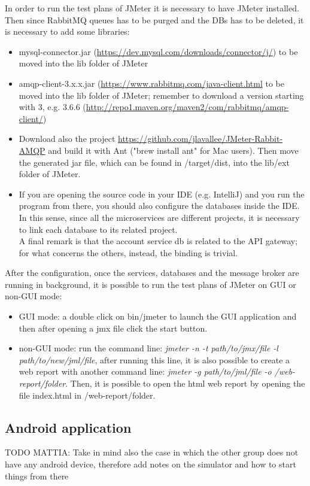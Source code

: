 \par
In order to run the test plans of JMeter it is necessary to have JMeter installed. Then since RabbitMQ queues has to be purged and the DBs has to be deleted, it is necessary to add some libraries:
\begin{itemize}
\item mysql-connector.jar (\url{https://dev.mysql.com/downloads/connector/j/}) to be moved into the lib folder of JMeter
\item amqp-client-3.x.x.jar (\url{https://www.rabbitmq.com/java-client.html} to be moved into the lib folder of JMeter; remember to download a version starting with 3, e.g. 3.6.6 (\url{http://repo1.maven.org/maven2/com/rabbitmq/amqp-client/})
\item Download also the project \url{https://github.com/jlavallee/JMeter-Rabbit-AMQP} and build it with Ant ("brew install ant" for Mac users). Then move the generated jar file, which can be found in /target/dist, into the lib/ext folder of JMeter.
\item If you are opening the source code in your IDE (e.g. IntelliJ) and you run the program from there, you should also configure
the databases inside the IDE. In this sense, since all the microservices are different projects, it is necessary to link each database
to its related project. \\ A final remark is that the account service db is related to the API gateway; for what concerns the others, instead,
the binding is trivial.   
\end{itemize}
After the configuration, once the services, databases and the message broker are running in background, it is possible to run the test plans of JMeter on GUI or non-GUI mode:
\begin{itemize}
\item GUI mode: a double click on bin/jmeter to launch the GUI application and then after opening a jmx file click the start button.
\item non-GUI mode: run the command line: \textit{jmeter -n -t path/to/jmx/file -l path/to/new/jml/file}, after running this line, it is also possible to create a web report with another command line: \textit{jmeter -g path/to/jml/file -o /web-report/folder}. Then, it is possible to open the html web report by opening the file index.html in /web-report/folder.
\end{itemize}

\subsection{Android application}
TODO MATTIA: Take in mind also the case in which the other group does not have any android device, therefore add notes on the simulator
and how to start things from there


